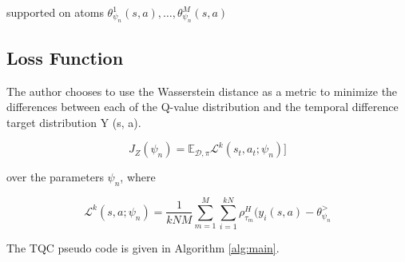 supported on atoms $ \theta_{\psi_n}^1(s,a), \dots, \theta_{\psi_n}^M(s,a) $ 






\subsection{Loss Function}

The author chooses to use the Wasserstein distance as a metric to minimize 
the differences between each of the Q-value distribution  
and the temporal difference target distribution Y (s, a).

\begin{equation}
  J_Z (\psi_n) = \mathbb{E}_{\mathcal{D}, \pi} \mathcal{L}^k(s_t,a_t; \psi_n)]
\end{equation}

over the parameters $\psi_n$, where

\begin{equation}
  \mathcal{L}^k(s,a; \psi_n) = \frac{1}{kNM} \sum_{m=1}^M \sum_{i=1}^{kN} \rho_{ \tau_m}^H(y_i(s, a) - \theta_{\psi_n}^>
\end{equation}



The TQC pseudo code is given in Algorithm \ref{alg:main}.   



